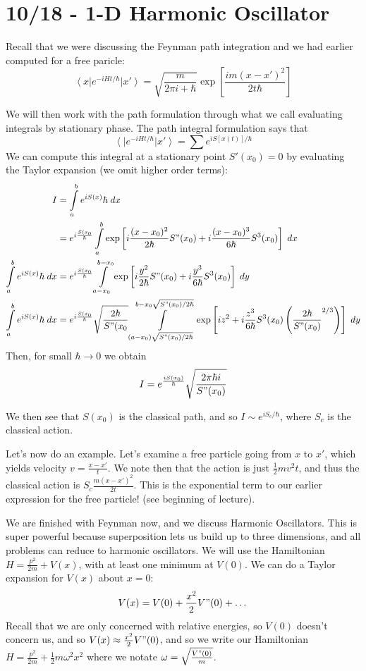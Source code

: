 \documentclass[10pt]{report}
\newcommand{\bra}[1]{\left<#1\right|}
\newcommand{\ket}[1]{\left|#1\right>}
\begin{document}
\chapter{10/18 - 1-D Harmonic Oscillator}

Recall that we were discussing the Feynman path integration and we had earlier computed for a free paricle:
$$\bra{x}e^{-iHt/\hbar}\ket{x'} = \sqrt{\frac{m}{2\pi i + \hbar}} \exp\left[ \frac{im(x-x')^2}{2t\hbar} \right]$$

We will then work with the path formulation through what we call evaluating integrals by stationary phase. The path integral formulation says that
$$\bra{}e^{-iHt/\hbar}\ket{x'} = \sum e^{iS[x(t)]/\hbar}$$
We can compute this integral at a stationary point $S'(x_0) = 0$ by evaluating the Taylor expansion (we omit higher order terms):
\begin{align}
	I &= \displaystyle\int\limits_{a}^{b}e^{iS(x)}\hbar\;dx \\
	&= e^{i\frac{S(x_0}{\hbar}}\displaystyle\int\limits_{a}^{b}\exp\left[ i\frac{(x-x_0)^2}{2\hbar}S"(x_0) + i\frac{(x-x_0)^3}{6\hbar}S^3(x_0)\right]\;dx\\
	\displaystyle\int\limits_{a}^{b}e^{iS(x)}\hbar\;dx &= e^{i\frac{S(x_0}{\hbar}}\displaystyle\int\limits_{a-x_0}^{b-x_0}\exp\left[ i\frac{y^2}{2\hbar}S"(x_0) + i\frac{y^3}{6\hbar}S^3(x_0)\right]\;dy\\
	\displaystyle\int\limits_{a}^{b}e^{iS(x)}\hbar\;dx &= e^{i\frac{S(x_0}{\hbar}}\sqrt{\frac{2\hbar}{S"(x_0}}\displaystyle\int\limits_{(a-x_0)\sqrt{S"(x_0)/2\hbar}}^{b-x_0\sqrt{S"(x_0)/2\hbar}}\exp\left[ iz^2 + i\frac{z^3}{6\hbar}S^3(x_0)\left( \frac{2\hbar}{S"(x_0)}^{2/3} \right)\right]\;dy\\
\end{align}
Then, for small $\hbar \to 0$ we obtain
$$I = e^{\frac{iS(x_0)}{\hbar}}\sqrt{\frac{2\pi\hbar i}{S"(x_0)}}$$

We then see that $S(x_0)$ is the classical path, and so $I \sim e^{iS_c/\hbar}$, where $S_c$ is the classical action. 

Let's now do an example. Let's examine a free particle going from $x$ to $x'$, which yields velocity $v=\frac{x-x'}{t}$. We note then that the action is just $\frac{1}{2}mv^2t$, and thus the classical action is $S_c\frac{m(x-x')^2}{2t}$. This is the exponential term to our earlier expression for the free particle! (see beginning of lecture).

We are finished with Feynman now, and we discuss Harmonic Oscillators. This is super powerful because superposition lets us build up to three dimensions, and all problems can reduce to harmonic oscillators. We will use the Hamiltonian $H=\frac{p^2}{2m} + V(x)$, with at least one minimum at $V(0)$. We can do a Taylor expansion for $V(x)$ about $x=0$:
$$V(x) = V(0) + \frac{x^2}{2}V"(0) + \dots$$
Recall that we are only concerned with relative energies, so $V(0)$ doesn't concern us, and so $V(x) \approx \frac{x^2}{2}V"(0)$, and so we write our Hamiltonian $H=\frac{p^2}{2m} + \frac{1}{2}m\omega^2x^2$ where we notate $\omega=\sqrt{\frac{V"(0)}{m}}$. 
\end{document}
